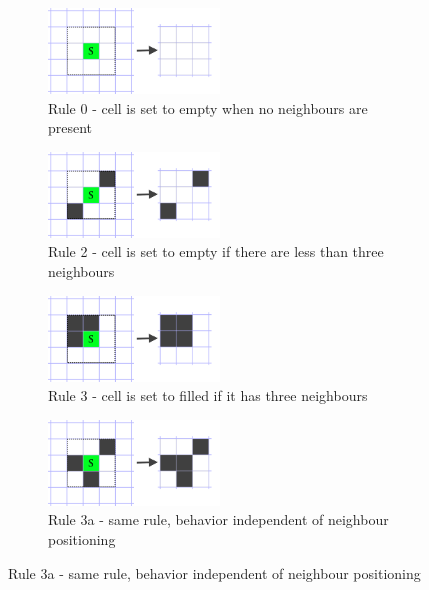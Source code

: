 \documentclass[12pt]{report}
\begin{document}
\begin{figure}[h]
	\centering
	\begin{subfigure}[b]{0.4\textwidth}
		\centering
		\includegraphics[width=0.5\textwidth]{images/rule0dead}
		\caption{Rule 0 - cell is set to empty when no neighbours are present} 
	\end{subfigure}
	\hfill
	\begin{subfigure}[b]{0.4\textwidth}
		\centering
		\includegraphics[width=0.5\textwidth]{images/rule2dead}
		\caption{Rule 2 - cell is set to empty if there are less than three neighbours} 
	\end{subfigure} 
	\hfill
	\begin{subfigure}[b]{0.4\textwidth}
		\centering
		\includegraphics[width=0.5\textwidth]{images/rule3alive}
		\caption{Rule 3 - cell is set to filled if it has three neighbours} 
	\end{subfigure} 
	\hfill
	\begin{subfigure}[b]{0.4\textwidth}
		\centering
		\includegraphics[width=0.5\textwidth]{images/rule3alive2}
		\caption{Rule 3a - same rule, behavior independent of neighbour positioning} 

\end{subfigure}
\end{figure}
\end{document}
